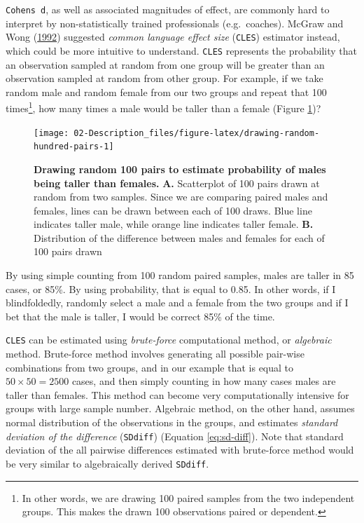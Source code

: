\documentclass[
]{book}
\begin{document}
\texttt{Cohen\textquotesingle{}s\ d}, as well as associated magnitudes of effect, are commonly hard to interpret by non-statistically trained professionals (e.g.~coaches). McGraw and Wong (\protect\hyperlink{ref-mcgrawCommonLanguageEffect1992}{1992}) suggested \emph{common language effect size} (\texttt{CLES}) estimator instead, which could be more intuitive to understand. \texttt{CLES} represents the probability that an observation sampled at random from one group will be greater than an observation sampled at random from other group. For example, if we take random male and random female from our two groups and repeat that 100 times\footnote{In other words, we are drawing 100 paired samples from the two independent groups. This makes the drawn 100 observations paired or dependent.}, how many times a male would be taller than a female (Figure \ref{fig:drawing-random-hundred-pairs})?

\begin{figure}

{\centering \texttt{[image: 02-Description\_files/figure-latex/drawing-random-hundred-pairs-1]} 

}

\caption{\textbf{Drawing random 100 pairs to estimate probability of males being taller than females.} \textbf{A.} Scatterplot of 100 pairs drawn at random from two samples. Since we are comparing paired males and females, lines can be drawn between each of 100 draws. Blue line indicates taller male, while orange line indicates taller female. \textbf{B.} Distribution of the difference between males and females for each of 100 pairs drawn}\label{fig:drawing-random-hundred-pairs}
\end{figure}



By using simple counting from 100 random paired samples, males are taller in 85 cases, or 85\%. By using probability, that is equal to 0.85. In other words, if I blindfoldedly, randomly select a male and a female from the two groups and if I bet that the male is taller, I would be correct 85\% of the time.

\texttt{CLES} can be estimated using \emph{brute-force} computational method, or \emph{algebraic} method. Brute-force method involves generating all possible pair-wise combinations from two groups, and in our example that is equal to \(50 \times 50 = 2500\) cases, and then simply counting in how many cases males are taller than females. This method can become very computationally intensive for groups with large sample number. Algebraic method, on the other hand, assumes normal distribution of the observations in the groups, and estimates \emph{standard deviation of the difference} (\texttt{SDdiff}) (Equation \eqref{eq:sd-diff}). Note that standard deviation of the all pairwise differences estimated with brute-force method would be very similar to algebraically derived \texttt{SDdiff}.
\end{document}
